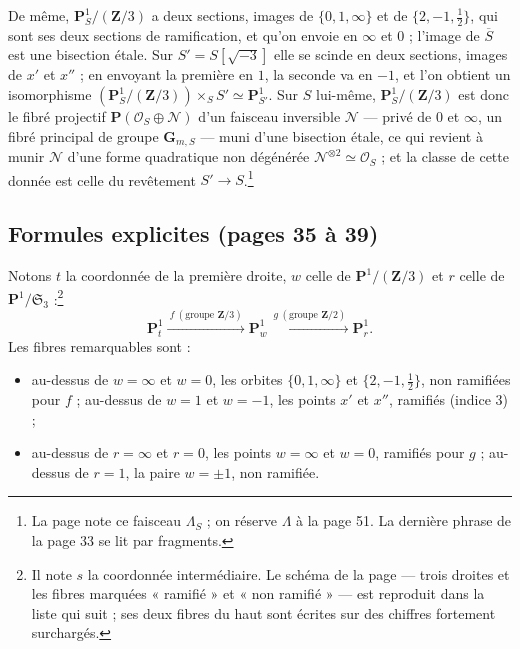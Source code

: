 \documentclass[11pt,a4paper]{article}
\begin{document}
De même, $\mathbf{P}^1_S/(\mathbf{Z}/3)$ a deux sections, images de $\{0, 1,
\infty\}$ et de $\{2, -1, \frac12\}$, qui sont ses deux sections de
ramification, et qu'on envoie en $\infty$ et $0$ ; l'image de $\overline{S}$ est
une bisection étale. Sur $S' = S[\sqrt{-3}]$ elle se scinde en deux sections,
images de $x'$ et $x''$ ; en envoyant la première en $1$, la seconde va en
$-1$, et l'on obtient un isomorphisme $(\mathbf{P}^1_S/(\mathbf{Z}/3))
\times_S S' \simeq \mathbf{P}^1_{S'}$. Sur $S$ lui-même,
$\mathbf{P}^1_S/(\mathbf{Z}/3)$ est donc le fibré projectif
$\mathbf{P}(\mathcal{O}_S \oplus \mathcal{N})$ d'un faisceau inversible
$\mathcal{N}$ --- privé de $0$ et $\infty$, un fibré principal de groupe
$\mathbf{G}_{m,S}$ --- muni d'une bisection étale, ce qui revient à munir
$\mathcal{N}$ d'une forme quadratique non dégénérée $\mathcal{N}^{\otimes 2}
\simeq \mathcal{O}_S$ ; et la classe de cette donnée est celle du revêtement
$S' \to S$.\footnote{La page note ce faisceau $\Lambda_S$ ; on réserve
$\Lambda$ à la page 51. La dernière phrase de la page 33 se lit par
fragments.}

\subsection*{Formules explicites (pages 35 à 39)}

Notons $t$ la coordonnée de la première droite, $w$ celle de
$\mathbf{P}^1/(\mathbf{Z}/3)$ et $r$ celle de $\mathbf{P}^1/\mathfrak{S}_3$ :\footnote{Il note $s$ la coordonnée intermédiaire. Le schéma de la page
--- trois droites et les fibres marquées « ramifié » et « non ramifié » ---
est reproduit dans la liste qui suit ; ses deux fibres du haut sont écrites
sur des chiffres fortement surchargés.}
\[
\mathbf{P}^1_t \xrightarrow{\ f\ (\text{groupe } \mathbf{Z}/3)\ } \mathbf{P}^1_w
\xrightarrow{\ g\ (\text{groupe } \mathbf{Z}/2)\ } \mathbf{P}^1_r .
\]
Les fibres remarquables sont :
\begin{itemize}
\item au-dessus de $w = \infty$ et $w = 0$, les orbites $\{0, 1, \infty\}$ et
$\{2, -1, \frac12\}$, non ramifiées pour $f$ ; au-dessus de $w = 1$ et $w =
-1$, les points $x'$ et $x''$, ramifiés (indice $3$) ;
\item au-dessus de $r = \infty$ et $r = 0$, les points $w = \infty$ et $w =
0$, ramifiés pour $g$ ; au-dessus de $r = 1$, la paire $w = \pm 1$, non
ramifiée.
\end{itemize}
\end{document}
